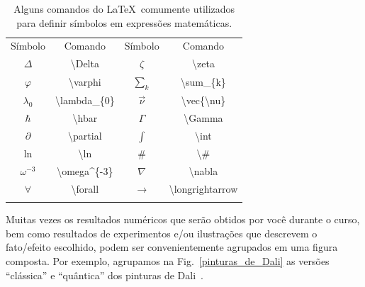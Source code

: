 \documentclass[a4wide]{report}
\begin{document}
\begin{table}[!h]
\centering
 \begin{tabular}{cccc}
  \hline\\[-0.37cm]
  \hline
 Símbolo    &            Comando                     &  Símbolo  &            Comando                \\ \hline
$\Delta$    & {\ttfamily \textbackslash Delta}       &  $\zeta$  & {\ttfamily \textbackslash zeta}   \\
$\varphi$   & {\ttfamily \textbackslash varphi}      & $\sum_k$  & {\ttfamily \textbackslash sum\_\{k\}}   \\
$\lambda_0$ & {\ttfamily \textbackslash lambda\_\{0\}} &  $\vec{\nu}$    & {\ttfamily \textbackslash vec\{\textbackslash nu\}}     \\
$\hbar$     & {\ttfamily \textbackslash hbar}        &  $\Gamma$ & {\ttfamily \textbackslash Gamma}  \\
$\partial$  & {\ttfamily \textbackslash partial}     & $\int$    & {\ttfamily \textbackslash int}        \\
$\ln$       & {\ttfamily \textbackslash ln}          &  $\#$   & {\ttfamily \textbackslash \#}  \\
$\omega^{-3}$ & {\ttfamily \textbackslash omega\textasciicircum \{-3\}} &  $\nabla$ & {\ttfamily \textbackslash nabla}  \\
$\forall$   & {\ttfamily \textbackslash forall}      &  $\longrightarrow$   & {\ttfamily \textbackslash longrightarrow}  \\
 \hline\\[-0.37cm]
  \hline
\end{tabular}
\caption{Alguns comandos do \LaTeX~comumente utilizados para definir símbolos em expressões matemáticas.}
\label{simbolos}
\end{table}



	Muitas vezes os resultados numéricos que serão obtidos por você durante o curso, 
bem como resultados de experimentos e/ou ilustrações que descrevem o fato/efeito escolhido,
podem ser convenientemente agrupados em uma figura composta.
	Por exemplo, agrupamos na Fig.~\ref{pinturas_de_Dali} as versões ``clássica''
e ``quântica'' dos pinturas de Dali~\cite{dali_paintings}.

~
\end{document}
